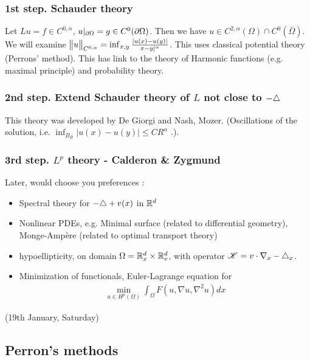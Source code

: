 \documentclass[12pt,a4paper]{article}
\renewenvironment{i}
{\begin{itemize} 
	}%
	{\end{itemize}
}
\begin{document}
\subsubsection*{1st step. Schauder theory}

Let $Lu = f \in C^{0, \alpha}$, $u|_{\partial \Omega}= g \in C^0(\partial \Omega)$. Then we have $u\in C^{2,\alpha}(\Omega) \cap C^0(\bar{\Omega})$. We will examine $\bigl\lVert u\bigr\rVert_{C^{0, \alpha}}= \inf_{x,y} \frac{|u(x)-u(y)|}{x-y|^{\alpha}}$. This uses classical potential theory (Perrons' method). This has link to the theory of Harmonic functions (e.g. maximal principle) and probability theory.

\subsubsection*{2nd step. Extend Schauder theory of $L$ not close to $-\triangle$}

This theory was developed by De Giorgi and Nash, Mozer. (Oscillations of the solution, i.e. $\inf_{B_R}|u(x)-u(y)| \leq CR^{\alpha}$ .).

\subsubsection*{3rd step. $L^p$ theory - Calderon \& Zygmund} 
\s

Later, would choose you preferences :
\begin{i}
\item Spectral theory for $-\triangle  + v(x)$ in $\mathbb{R}^d$

\item Nonlinear PDEs, e.g. Minimal surface (related to differential geometry), Monge-Amp\`{e}re (related to optimal transport theory)

\item hypoellipticity, on domain $\Omega = \mathbb{R}^d_x \times \mathbb{R}^d_v$, with operator $\mathscr{K} = v\cdot \nabla_x - \triangle_x$. 

\item Minimization of functionals, Euler-Lagrange equation for
\begin{align*}
\min_{u\in H^p(\Omega)} \int_{\Omega} F(u, \nabla u, \nabla^2 u) dx
\end{align*}
\end{i}
\s

\newday

(19th January, Saturday)
\s

\subsection*{Perron's methods}
\end{document}

